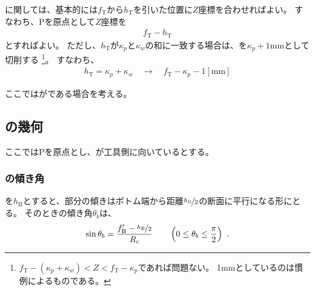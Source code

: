 \clearpage
\modHeadsection{\TopOutcutLength}
\TopOutcutLength に関しては、基本的には\AlocationLength$f_\mathrm T$から\TopOutcutLength$h_\mathrm T$を引いた位置に$Z$座標を合わせればよい。
すなわち、\TableCenter Pを原点として$Z$座標を
\begin{align*}
  f_\mathrm T - h_\mathrm T
\end{align*}
とすればよい。
ただし、\TopOutcutLength$h_\mathrm T$が\KeywayPos$\kappa_p$と\KeywayWidth$\kappa_w$の和に一致する場合は、\TopOutcutLength を$\kappa_p+1$mmとして切削する
\footnote{$f_\mathrm T-(\kappa_p+\kappa_w) < Z < f_\mathrm T-\kappa_p$であれば問題ない。
1mmとしているのは慣例によるものである。}。
すなわち、
\begin{align*}
  h_\mathrm T = \kappa_p+\kappa_w \quad \longrightarrow \quad f_\mathrm T-\kappa_p-1[\mathrm{mm}]
\end{align*}



\clearpage
ここでは\Outcut が\CurvedOutcut である場合を考える。


\subsection{\BottomCurvedOutcut の幾何}
ここでは\TableCenter Pを原点とし、\BottomEndFace が工具側に向いているとする。

\subsubsection{\BottomCurvedOutcut の傾き角}
\BottomOutcutLength を$h_\mathrm B$とすると、\nameCurvedOutcut 部分の傾きはボトム端から距離$\nicefrac{h_\mathrm B}2$の断面に平行になる形にとる。
そのときの傾き角$\theta_b$は、
\begin{align}
  \label{eq:BCurvedOutcutAngle}
  \sin\theta_b = \frac{f_\mathrm B'-\nicefrac{h_\mathrm B}2}{R_\mathrm c}
  \qquad\left(0 \leq \theta_b \leq \frac\pi2\right)\ .
\end{align}

